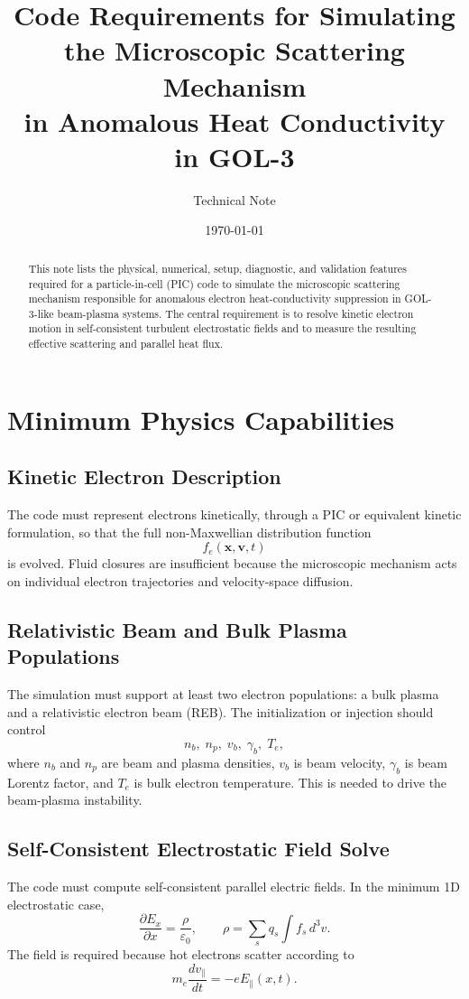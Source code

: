 \documentclass[11pt,a4paper]{article}
\title{Code Requirements for Simulating the Microscopic Scattering Mechanism\\in Anomalous Heat Conductivity in GOL-3}
\author{Technical Note}
\date{\today}
\begin{document}
\maketitle

\begin{abstract}
This note lists the physical, numerical, setup, diagnostic, and validation features required for a particle-in-cell (PIC) code to simulate the microscopic scattering mechanism responsible for anomalous electron heat-conductivity suppression in GOL-3-like beam-plasma systems. The central requirement is to resolve kinetic electron motion in self-consistent turbulent electrostatic fields and to measure the resulting effective scattering and parallel heat flux.
\end{abstract}

\section{Minimum Physics Capabilities}

\subsection{Kinetic Electron Description}
The code must represent electrons kinetically, through a PIC or equivalent kinetic formulation, so that the full non-Maxwellian distribution function
\begin{equation}
    f_e(\mathbf{x},\mathbf{v},t)
\end{equation}
is evolved. Fluid closures are insufficient because the microscopic mechanism acts on individual electron trajectories and velocity-space diffusion.

\subsection{Relativistic Beam and Bulk Plasma Populations}
The simulation must support at least two electron populations: a bulk plasma and a relativistic electron beam (REB). The initialization or injection should control
\begin{equation}
    n_b,\; n_p,\; v_b,\; \gamma_b,\; T_e,
\end{equation}
where $n_b$ and $n_p$ are beam and plasma densities, $v_b$ is beam velocity, $\gamma_b$ is beam Lorentz factor, and $T_e$ is bulk electron temperature. This is needed to drive the beam-plasma instability.

\subsection{Self-Consistent Electrostatic Field Solve}
The code must compute self-consistent parallel electric fields. In the minimum 1D electrostatic case,
\begin{equation}
    \frac{\partial E_x}{\partial x} = \frac{\rho}{\varepsilon_0}, \qquad
    \rho = \sum_s q_s \int f_s\,d^3v .
\end{equation}
The field is required because hot electrons scatter according to
\begin{equation}
    m_e \frac{d v_\parallel}{dt} = -e E_\parallel(x,t).
\end{equation}
\end{document}
